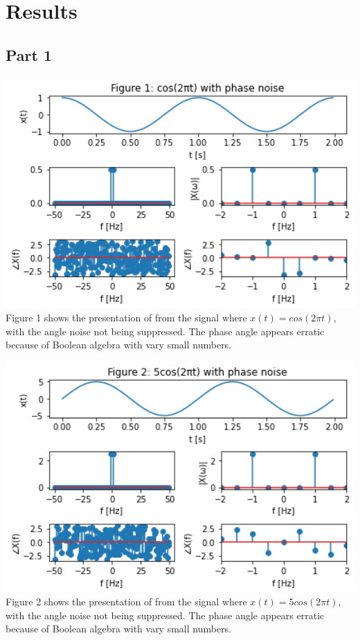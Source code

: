 \documentclass[12pt,a4paper]{article}
\begin{document}
\section{Results}\label{sec:res}
\subsection*{Part 1}


\includegraphics[width=1\textwidth]{Figure1.png}\\
Figure 1 shows the presentation of from the signal where $x(t)=cos(2 \pi t)$, with the angle noise not being suppressed. The phase angle appears erratic because of Boolean algebra with vary small numbers.

\includegraphics[width=1\textwidth]{Figure2.png}\\
Figure 2 shows the presentation of from the signal where $x(t) =5cos(2 \pi t)$, with the angle noise not being suppressed. The phase angle appears erratic because of Boolean algebra with vary small numbers.
\end{document}
